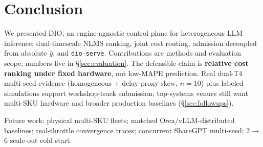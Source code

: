 \documentclass[10pt,twocolumn,letterpaper]{article}
\begin{document}

\section{Conclusion}
\label{sec:conclusion}

We presented DIO, an engine-agnostic control plane for heterogeneous LLM inference: dual-timescale NLMS ranking, joint cost routing, admission decoupled from absolute $\hat{y}$, and \texttt{dio-serve}. Contributions are methods and evaluation scope; numbers live in \S\ref{sec:evaluation}. The defensible claim is \textbf{relative cost ranking under fixed hardware}, not low-MAPE prediction. Real dual-T4 multi-seed evidence (homogeneous $+$ delay-proxy skew, $n{=}10$) plus labeled simulations support workshop-track submission; top-systems venues still want multi-SKU hardware and broader production baselines (\S\ref{sec:followups}).

Future work: physical multi-SKU fleets; matched Orca/vLLM-distributed baselines; real-throttle convergence traces; concurrent ShareGPT multi-seed; 2$\rightarrow$6 scale-out cold start.
\end{document}
